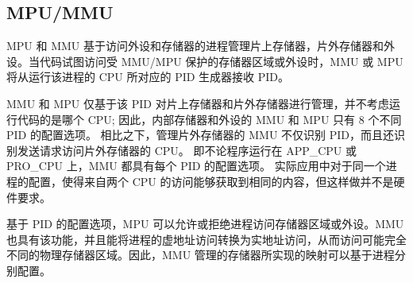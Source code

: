 \documentclass[main\_\_CN.tex]{subfiles}
\begin{document}
\subsection{MPU/MMU}

 MPU 和 MMU 基于访问外设和存储器的进程管理片上存储器，片外存储器和外设。当代码试图访问受 MMU/MPU 保护的存储器区域或外设时，MMU 或 MPU 将从运行该进程的 CPU 所对应的 PID 生成器接收 PID。

 MMU 和 MPU 仅基于该 PID 对片上存储器和片外存储器进行管理，并不考虑运行代码的是哪个 CPU; 因此，内部存储器和外设的 MMU 和 MPU 只有 8 个不同 PID 的配置选项。 相比之下，管理片外存储器的 MMU 不仅识别 PID，而且还识别发送请求访问片外存储器的 CPU。 即不论程序运行在 APP\_CPU 或 PRO\_CPU 上，MMU 都具有每个 PID 的配置选项。 实际应用中对于同一个进程的配置，使得来自两个 CPU 的访问能够获取到相同的内容，但这样做并不是硬件要求。

基于 PID 的配置选项，MPU 可以允许或拒绝进程访问存储器区域或外设。MMU 也具有该功能，并且能将进程的虚地址访问转换为实地址访问，从而访问可能完全不同的物理存储器区域。因此，MMU 管理的存储器所实现的映射可以基于进程分别配置。








\end{document}
